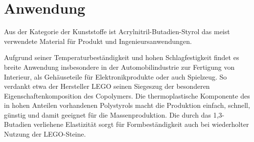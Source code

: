     \section{Anwendung}\label{sec:anwendung}
            Aus der Kategorie der Kunststoffe ist Acrylnitril-Butadien-Styrol das meist verwendete Material für Produkt und
            Ingenieursanwendungen.

            Aufgrund seiner Temperaturbeständigkeit und hohen Schlagfestigkeit findet es breite Anwendung insbesondere in der
            Automobilindustrie zur Fertigung von Interieur, als Gehäuseteile für Elektronikprodukte oder auch Spielzeug. So verdankt etwa der Hersteller
            \textsc{LEGO} seinen Siegeszug der besonderen Eigenschaftenkomposition des Copolymers. Die thermoplastische Komponente
            des in hohen Anteilen vorhandenen Polystyrols macht die Produktion einfach, schnell, günstig und damit geeignet
            für die Massenproduktion. Die durch das 1,3-Butadien verliehene Elastizität sorgt für Formbeständigkeit auch bei
            wiederholter Nutzung der \textsc{LEGO}-Steine.

